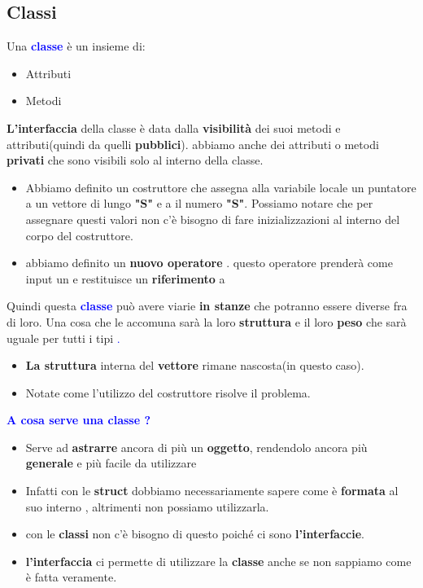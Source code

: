 \subsection{Classi}
Una \textcolor{blue}{\textbf{classe}} è un insieme di:
\begin{itemize}
    \item Attributi
    \item Metodi
\end{itemize}
\textbf{L'interfaccia} della classe è data dalla \textbf{visibilità} dei suoi metodi e attributi(quindi da quelli \textbf{pubblici}). abbiamo anche dei attributi o metodi \textbf{privati} che sono visibili solo al interno della classe.
\begin{tcolorbox}[width=15cm, boxsep=10pt]
    
    
\end{tcolorbox}
\begin{itemize}
    \item Abbiamo definito un costruttore che assegna alla variabile locale \textcolor{blue}{} un puntatore a un vettore di \textcolor{blue}{ }lungo \textbf{"S"} e a \textcolor{blue}{} il numero \textbf{"S"}. Possiamo notare che per assegnare questi valori non c'è bisogno di fare inizializzazioni al interno del corpo del costruttore.
    \item abbiamo definito un \textbf{nuovo operatore \code{\textcolor{blue}{[]}}}. questo operatore prenderà come input un  e restituisce un \textbf{riferimento} a \textcolor{blue}{}\newline
\end{itemize}
Quindi questa \textbf{\textcolor{blue}{classe}} può avere viarie \textbf{in stanze} che potranno essere diverse fra di loro. Una cosa che le accomuna sarà la loro \textbf{struttura} e il loro \textbf{peso} che sarà uguale per tutti i tipi \textcolor{blue}{.}

\begin{itemize}
    \item  \textbf{La struttura} interna del \textbf{vettore} rimane nascosta(in questo caso).
    \item Notate come l’utilizzo del costruttore risolve il problema.
\end{itemize}
\newpage
\textbf{\textcolor{blue}{A cosa serve una classe ?}}
\begin{itemize}
    \item Serve ad \textbf{astrarre} ancora di più un \textbf{oggetto}, rendendolo ancora più \textbf{generale} e più facile da utilizzare
    \item Infatti con le \textbf{struct} dobbiamo necessariamente sapere come è \textbf{formata} al suo interno , altrimenti non possiamo utilizzarla.
    \item con le \textbf{classi} non c'è bisogno di questo poiché ci sono \textbf{l'interfaccie}.
    \item \textbf{l'interfaccia} ci permette di utilizzare la \textbf{classe} anche se non sappiamo come è fatta veramente.
\end{itemize}

